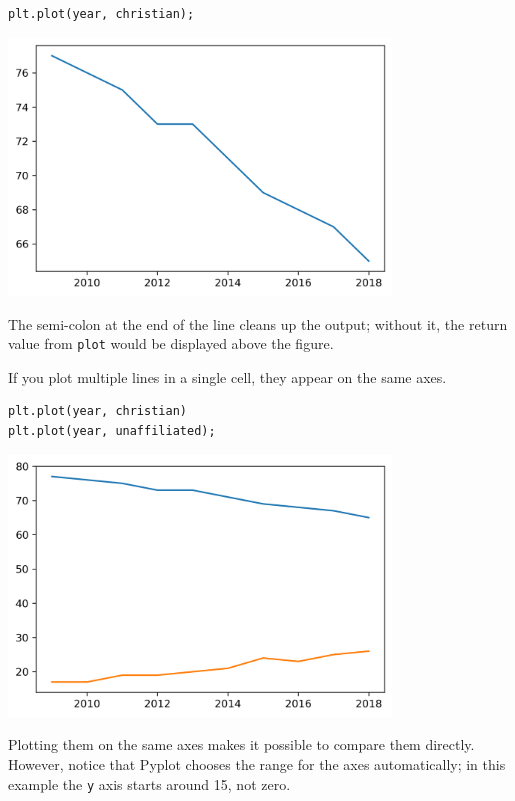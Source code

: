 \begin{lstlisting}[]
plt.plot(year, christian);
\end{lstlisting}

\begin{center}
\includegraphics[width=4in]{chapters/06_plotting_files/06_plotting_24_0.png}
\end{center}

The semi-colon at the end of the line cleans up the output; without it,
the return value from \passthrough{\lstinline!plot!} would be displayed
above the figure.

If you plot multiple lines in a single cell, they appear on the same
axes.

\begin{lstlisting}[]
plt.plot(year, christian)
plt.plot(year, unaffiliated);
\end{lstlisting}

\begin{center}
\includegraphics[width=4in]{chapters/06_plotting_files/06_plotting_26_0.png}
\end{center}

Plotting them on the same axes makes it possible to compare them
directly. However, notice that Pyplot chooses the range for the axes
automatically; in this example the \passthrough{\lstinline!y!} axis
starts around 15, not zero.

